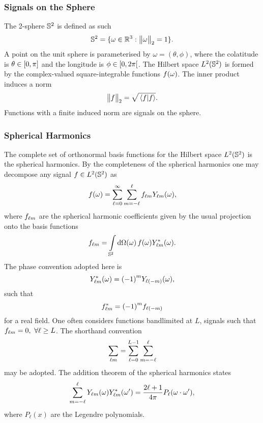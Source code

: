 \subsubsection{Signals on the Sphere}

The 2-sphere \(\twoSphere{}\) is defined as such
%
\begin{equation}
	\twoSphere{} = \set{\omega \in \mathbb{R}^{3} : \norm{\omega} = 1}.
\end{equation}
%
A point on the unit sphere is parameterised by \(\omega=(\theta,\phi)\), where the colatitude is \(\theta \in \interval{0}{\pi}\) and the longitude is \(\phi \in \interval[open right]{0}{2\pi}\).
The Hilbert space \(\hilbert{\twoSphere}\) is formed by the complex-valued square-integrable functions \(\pixel{f}\).
The inner product induces a norm
%
\begin{equation}
	\norm{f} = \sqrt{\braket*{f}}.
\end{equation}
%
Functions with a finite induced norm are signals on the sphere.

\subsubsection{Spherical Harmonics}

The complete set of orthonormal basis functions for the Hilbert space \(\hilbert{\twoSphere}\) is the spherical harmonics.
By the completeness of the spherical harmonics one may decompose any signal \(f \in \hilbert{\twoSphere}\) as
%
\begin{equation}
	\pixel{f}
	= \sum\limits_{\ell=0}^{\infty} \sum\limits_{m=-\ell}^{\ell} \harmonic{f} \pixel{\harmonic{Y}},
\end{equation}
%
where \(\harmonic{f}\) are the spherical harmonic coefficients given by the usual projection onto the basis functions
%
\begin{equation}
	\harmonic{f}
	= \integrateSphere{\omega} \pixel{f} \pixel{\conj{\harmonic{Y}}}.
\end{equation}
%
The phase convention adopted here is
%
\begin{equation}
	\pixel{\conj{\harmonic{Y}}}
	= \phaseFactor \pixel{Y_{\ell(-m)}},
\end{equation}
%
such that
%
\begin{equation}
	\conj{\harmonic{f}}
	= \phaseFactor f_{\ell(-m)}
\end{equation}
%
for a real field.
One often considers functions bandlimited at \(L\), \ie{} signals such that \(\harmonic{f} = 0,\ \forall \ell \geq L\).
The shorthand convention
%
\begin{equation}
	\harmonicSum
	= \sum\limits_{\ell=0}^{L-1} \sum\limits_{m=-\ell}^{\ell}
\end{equation}
%
may be adopted.
The addition theorem of the spherical harmonics states
%
\begin{equation}\label{eq:chapter4_addition_theorem}
	\sum\limits_{m=-\ell}^{\ell} \pixel{\harmonic{Y}} \pixel[']{\conj{\harmonic{Y}}}
	= \factor P_{\ell}(\omega \cdot \omega'),
\end{equation}
%
where \(P_{\ell}(x)\) are the Legendre polynomials.

